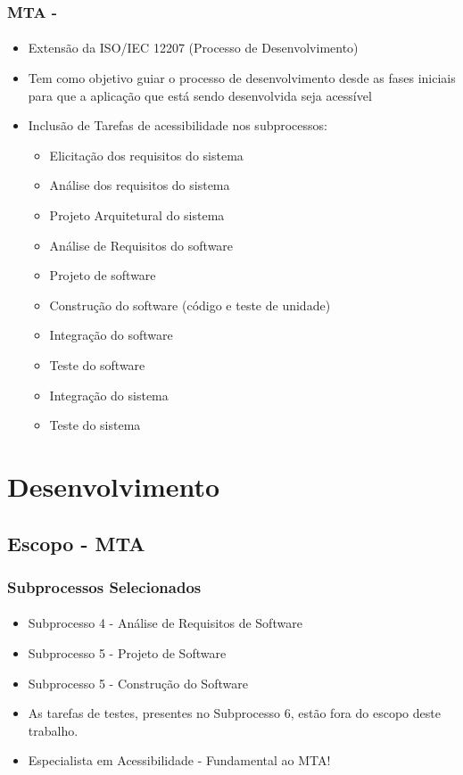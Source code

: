 \documentclass{beamer}
\begin{document}
\begin{frame}
\frametitle{MTA - \citet{maia:10}}
\framesubtitle{}

\begin{itemize}
  \item Extensão da ISO/IEC 12207 (Processo de Desenvolvimento)
  \item Tem como objetivo guiar o processo de desenvolvimento desde as fases iniciais para que a aplicação que está sendo desenvolvida seja acessível
  \item Inclusão de Tarefas de acessibilidade nos subprocessos:
  	\begin{multicols}{2}
  	\begin{itemize}
  	 	\item Elicitação dos requisitos do sistema
  	 	\item Análise dos requisitos do sistema
  	 	\item Projeto Arquitetural do sistema
  	 	\item Análise de Requisitos do software
  	 	\item Projeto de software
  	 	\item Construção do software (código e teste de unidade)
  	 	\item Integração do software
  	 	\item Teste do software
  	 	\item Integração do sistema
  	 	\item Teste do sistema
  	 \end{itemize}
  	\end{multicols}  
\end{itemize}

\end{frame}

\section{Desenvolvimento}

\subsection[Escopo - MTA]{Escopo - MTA}

\begin{frame}
\frametitle{Subprocessos Selecionados}
\framesubtitle{}

\begin{itemize}
  \item Subprocesso 4 - Análise de Requisitos de Software
  \item Subprocesso 5 - Projeto de Software
  \item Subprocesso 5 - Construção do Software
  \item As tarefas de testes, presentes no Subprocesso 6, estão fora do escopo deste trabalho.
  \item Especialista em Acessibilidade - Fundamental ao MTA!
\end{itemize}

\end{frame}
\end{document}
